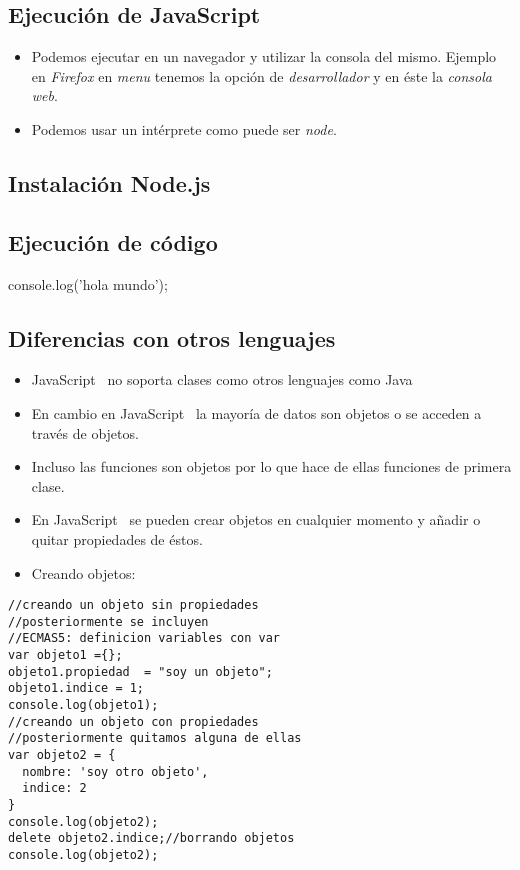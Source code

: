 \documentclass[4paper]{article}
\newcommand{\J}{JavaScript}
\begin{document}
\subsection{Ejecución de \J}
\begin{itemize}
\item Podemos ejecutar en un navegador y utilizar la consola del mismo. Ejemplo en \emph{Firefox} en \emph{menu} tenemos la opción de \textit{desarrollador} y en éste la \textit{consola web}.
\item Podemos usar un intérprete como puede ser \textit{node}.
\end{itemize}

\subsection{Instalación Node.js}
\subsection{Ejecución de código}
console.log('hola mundo');

\subsection{Diferencias con otros lenguajes}
\begin{itemize}
\item \J ~ no soporta clases como otros lenguajes como Java
\item En cambio en \J ~ la mayoría de datos son objetos o se acceden a través de objetos.
\item Incluso las funciones son objetos por lo que hace de ellas funciones de primera clase.
\item En \J ~ se pueden crear objetos en cualquier momento y añadir o quitar propiedades de éstos.
\item Creando objetos:
\end{itemize}
\begin{lstlisting}
//creando un objeto sin propiedades 
//posteriormente se incluyen
//ECMAS5: definicion variables con var
var objeto1 ={};
objeto1.propiedad  = "soy un objeto";
objeto1.indice = 1;
console.log(objeto1);
//creando un objeto con propiedades
//posteriormente quitamos alguna de ellas
var objeto2 = {
  nombre: 'soy otro objeto',
  indice: 2
}
console.log(objeto2);
delete objeto2.indice;//borrando objetos
console.log(objeto2);
\end{lstlisting}
\end{document}
